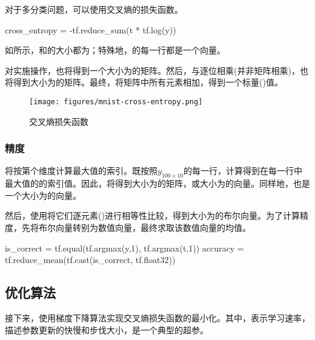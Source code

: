 \begin{content}
对于多分类问题，可以使用交叉熵的损失函数。

\begin{leftbar}
\begin{python}
cross_entropy = -tf.reduce_sum(t * tf.log(y))
\end{python}
\end{leftbar}

如所示，和的大小都为\code{[100, 10]}；特殊地，的每一行都是一个向量。

对实施操作，也将得到一个大小为\code{[100, 10]}的矩阵。然后，与逐位相乘(并非矩阵相乘)，也将得到大小为\code{[100, 10]}的矩阵。最终，将矩阵中所有元素相加，得到一个标量()值。

\begin{figure}[H]
\centering
\texttt{[image: figures/mnist-cross-entropy.png]}
\caption{交叉熵损失函数}
 \label{fig:mnist-cross-entropy}
\end{figure}

\subsubsection{精度}

将按第个维度计算最大值的索引。既按照$ y_{100 \times 10} $的每一行，计算得到在每一行中最大值的的索引值。因此，将得到大小为\code{[100, 1]}的矩阵，或大小为的向量。同样地，也是一个大小为的向量。

然后，使用将它们逐元素()进行相等性比较，得到大小为的布尔向量。为了计算精度，先将布尔向量转别为数值向量，最终求取该数值向量的均值。

\begin{leftbar}
\begin{python}
is_correct = tf.equal(tf.argmax(y,1), tf.argmax(t,1))
accuracy = tf.reduce_mean(tf.cast(is_correct, tf.float32))
\end{python}
\end{leftbar}

\subsection{优化算法}

接下来，使用梯度下降算法实现交叉熵损失函数的最小化。其中，表示学习速率，描述参数更新的快慢和步伐大小，是一个典型的超参。


\end{content}
